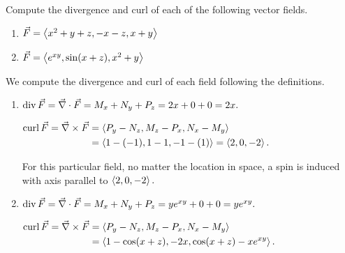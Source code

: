 \begin{example}\label{ex_vectorfield2}%
Compute the divergence and curl of each of the following vector fields.
\begin{enumerate}
	\item $\vec F =\left\langle x^2+y+z, -x-z, x+y\right\rangle$
	\item	$\vec F =\left\langle e^{xy}, \sin(x+z),x^2+y\right\rangle$
\end{enumerate}
\solution
We compute the divergence and curl of each field following the definitions.
\begin{enumerate}
	\item $\operatorname{div} \vec F = \vec\nabla \cdot \vec F = M_x+N_y+P_z = 2x+0+0= 2x.$
	
	$\begin{aligned}\operatorname{curl}\vec F = \vec\nabla \times \vec F &=\left\langle P_y-N_z,M_z-P_x,N_x - M_y\right\rangle\\ &=\left\langle 1 - (-1), 1-1,-1-(1)\right\rangle=\left\langle 2,0,-2\right\rangle.
	\end{aligned}$
	
	For this particular field, no matter the location in space, a spin is induced with axis parallel to $\left\langle 2,0,-2\right\rangle.$
	\item $\operatorname{div} \vec F = \vec\nabla \cdot \vec F = M_x+N_y+P_z = ye^{xy}+0+0= ye^{xy}.$
		
	$\begin{aligned}\operatorname{curl}\vec F = \vec\nabla \times \vec F &=\left\langle P_y-N_z,M_z-P_x,N_x - M_y\right\rangle\\ &=\left\langle 1-\cos(x+z), -2x, \cos(x+z) - xe^{xy}\right\rangle.\end{aligned}$
\end{enumerate}
\end{example}

